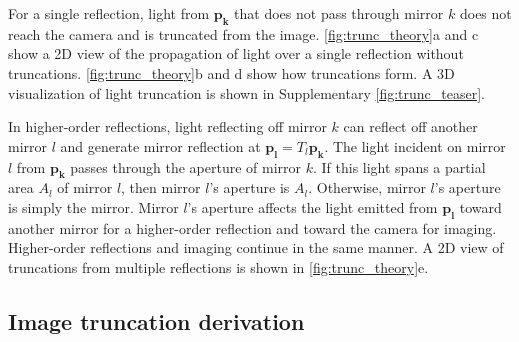 For a single reflection, light from $\bm{p_k}$ that does not pass through mirror 
$k$ does not reach the camera and is truncated from the image.
\cref{fig:trunc_theory}a and c show a 2D view of the propagation of light over a single reflection without truncations.
\cref{fig:trunc_theory}b and d show how truncations form.
A 3D visualization of light truncation is shown in Supplementary \cref*{fig:trunc_teaser}.




In higher-order reflections, light reflecting off mirror $k$ can 
reflect off another mirror $l$ and generate mirror reflection 
at $\bm{p_l}=T_l \bm{p_k}$.
The light incident on mirror $l$ from $\bm{p_k}$ passes through the aperture 
of mirror $k$.
If this light spans a partial area $A_l$ of mirror $l$, then mirror $l$'s aperture is $A_l$.
Otherwise, mirror $l$'s aperture is simply the mirror.
Mirror $l$'s aperture affects the light emitted from $\bm{p_l}$ toward another 
mirror for a higher-order reflection and toward the camera for imaging.
Higher-order reflections and imaging continue in the same manner.
A 2D view of truncations from multiple reflections is shown in \cref{fig:trunc_theory}e.


\subsection{Image truncation derivation} \label{sec:image_truncations}

